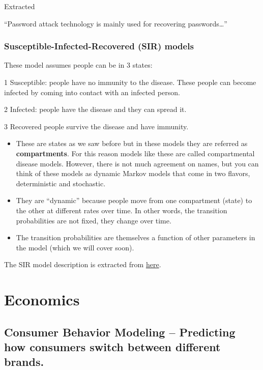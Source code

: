 \documentclass[
  letterpaper,
  DIV=11,
  numbers=noendperiod]{scrreprt}
\begin{document}
Extracted

``Password attack technology is mainly used for recovering
passwords\ldots{}''

\subsubsection{Susceptible-Infected-Recovered (SIR)
models}\label{susceptible-infected-recovered-sir-models}

These model assumes people can be in 3 states:

1 Susceptible: people have no immunity to the disease. These people can
become infected by coming into contact with an infected person.

2 Infected: people have the disease and they can spread it.

3 Recovered people survive the disease and have immunity.

\begin{itemize}
\item
  These are states as we saw before but in these models they are
  referred as \textbf{compartments}. For this reason models like these
  are called compartmental disease models. However, there is not much
  agreement on names, but you can think of these models as dynamic
  Markov models that come in two flavors, deterministic and stochastic.
\item
  They are ``dynamic'' because people move from one compartment (state)
  to the other at different rates over time. In other words, the
  transition probabilities are not fixed, they change over time.
\item
  The transition probabilities are themselves a function of other
  parameters in the model (which we will cover soon).
\end{itemize}

The SIR model description is extracted from
\href{https://clas.ucdenver.edu/marcelo-perraillon/sites/default/files/attached-files/lecture_12_inf_model.pdf}{here}.

\section{Economics}\label{economics}

\subsection{Consumer Behavior Modeling -- Predicting how consumers
switch between different
brands.}\label{consumer-behavior-modeling-predicting-how-consumers-switch-between-different-brands.}
\end{document}
